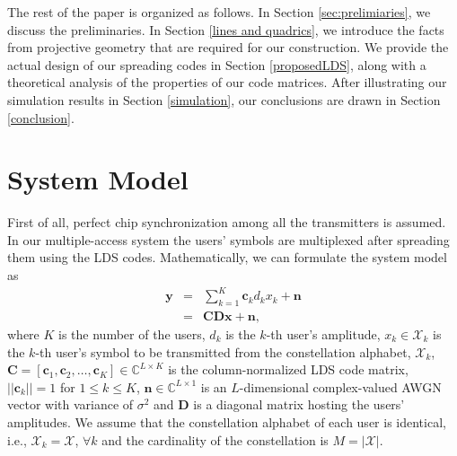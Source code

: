 \documentclass[journal,comsoc]{IEEEtran}
\newcommand{\nid}{\noindent}
\begin{document}
The rest of the paper is organized as follows. In Section \ref{sec:prelimiaries}, we discuss the preliminaries. In Section \ref{lines and quadrics}, we introduce the facts from projective geometry that are required for our construction. We provide the actual design of our spreading codes in Section \ref{proposedLDS}, along with a theoretical analysis of the properties of our code matrices. \iffalse We find that the cross-correlation properties of the code matrices we propose are either optimal or asymptotically optimal.  Next, we provide our proposed detection method for AWGN channels in Section \ref{detection}. \fi After illustrating our simulation results in Section \ref{simulation}, our conclusions are drawn in Section \ref{conclusion}.
\iffalse
	The following notations are used in this paper. All boldface lower
case letters indicate column vectors and boldface upper case letters indicate
matrices, $()^T$ denotes transpose operation, \iffalse $\mathsf{sgn}$ denotes the sign function, $| . |$ is the scalar magnitude, $||\cdot||_p$ denotes ${\ell}_p$ norm, $|| \cdot || \triangleq || \cdot ||_2$ is vector norm $\mathbb{E} \{ \cdot \}$ denotes expected value, \fi $p$ denotes a prime number, $q = p^r$ denotes a power of $p$, $\mathbb{F}_q$ denotes the finite field of size $q$, and $\mathbb{F}_q^*$ denotes the multiplicative group of $\mathbb{F}_q$. \fi
\section{System Model}
First of all, perfect chip synchronization among all the transmitters is assumed. In our multiple-access system the users' symbols are multiplexed after spreading them using the LDS codes. Mathematically, we can formulate the system model as\vspace{-0.0cm}
		\begin{eqnarray}
	\label{systemModelAWGN} \mathbf{y} &=& \sum_{k = 1}^K \mathbf{c}_k d_k x_k + \mathbf{n} \nonumber \\  &=& \mathbf{C}\mathbf{D}\mathbf{x} + \mathbf{n},
	\end{eqnarray}
	\nid where $K$ is the number of the users, $d_k$ is the $k$-th user's amplitude, $x_k \in \mathcal{X}_k$ is the $k$-th user's symbol to be transmitted from the constellation alphabet, $\mathcal{X}_k$, $\mathbf{C}= [\mathbf{c}_1, \mathbf{c}_2, \dots, \mathbf{c}_K] \in \mathbb{C}^{L \times K}$ is the column-normalized LDS code matrix, $||\mathbf{c}_k|| = 1$ for $1 \leq k \leq K$, $\mathbf{n}\in \mathbb{C}^{L \times 1}$ is an $L$-dimensional complex-valued AWGN vector with variance of $\sigma^2$ and $\mathbf{D}$ is a diagonal matrix hosting the users' amplitudes. We assume that the constellation alphabet of each user is identical, i.e., $\mathcal{X}_k = \mathcal{X}$, $\forall k$ and the cardinality of the constellation is $M = | \mathcal{X} |$.
\end{document}
